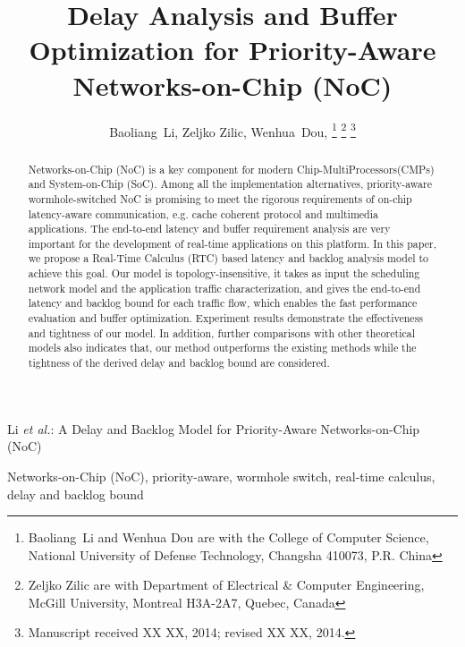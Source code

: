 \documentclass[10pt,journal]{IEEEtran}
\begin{document}
\title{Delay Analysis and Buffer Optimization for Priority-Aware Networks-on-Chip (NoC)}


\author{Baoliang~Li, %
        Zeljko Zilic, %
        Wenhua~Dou, %
\thanks{Baoliang~Li and Wenhua Dou are with the College of Computer Science, National University of Defense Technology, Changsha 410073, P.R. China}%
\thanks{Zeljko Zilic are with Department of Electrical \& Computer Engineering, McGill University, Montreal H3A-2A7, Quebec, Canada}%
\thanks{Manuscript received XX XX, 2014; revised XX XX, 2014.}}

%
{Li \MakeLowercase{\textit{et al.}}: A Delay and Backlog Model for Priority-Aware Networks-on-Chip (NoC)}

\maketitle

\begin{abstract}
Networks-on-Chip (NoC) is a key component for modern Chip-MultiProcessors(CMPs) and System-on-Chip (SoC). Among all the implementation alternatives, priority-aware wormhole-switched NoC is promising to meet the rigorous requirements of on-chip latency-aware communication, e.g. cache coherent protocol and multimedia applications. The end-to-end latency and buffer requirement analysis are very important for the development of real-time applications on this platform. In this paper, we propose a Real-Time Calculus (RTC) based latency and backlog analysis model to achieve this goal. Our model is topology-insensitive, it takes as input the scheduling network model and the application traffic characterization, and gives the end-to-end latency and backlog bound for each traffic flow, which enables the fast performance evaluation and buffer optimization. Experiment results demonstrate the effectiveness and tightness of our model. In addition, further comparisons with other theoretical models also indicates that, our method outperforms the existing methods while the tightness of the derived delay and backlog bound are considered.
\end{abstract}
\begin{IEEEkeywords}
Networks-on-Chip (NoC), priority-aware, wormhole switch, real-time calculus, delay and backlog bound
\end{IEEEkeywords}
\end{document}
